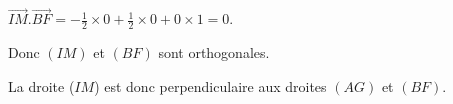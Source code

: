 \begin{corrige}
\begin{enumerate}
\begin{enumerate}
\begin{itemize}
                    \par
                    $\overrightarrow{IM}.\overrightarrow{BF}=-\frac{1}{2} \times 0 + \frac{1}{2} \times 0 + 0 \times 1=0$.
                    \par
                    Donc $(IM)$ et $(BF)$ sont orthogonales.
               \end{itemize}
               La droite ($IM$) est donc perpendiculaire aux droites $(AG)$ et $(BF)$.
          \end{enumerate}
     \end{enumerate}
\end{corrige}

